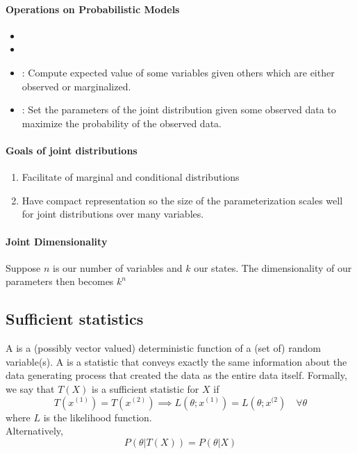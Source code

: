 \documentclass[11pt]{article}
\begin{document}
\paragraph{Operations on Probabilistic Models}
\begin{itemize}
	\item {}
	\item {}
	\item {}: Compute expected value of some variables given others which are either observed or marginalized.
	\item {}: Set the parameters of the joint distribution given some observed data to maximize the probability of the observed data.
\end{itemize}

\paragraph{Goals of joint distributions}
\begin{enumerate}
	\item Facilitate  of marginal and conditional distributions
	\item Have compact representation so the size of the parameterization scales well for joint distributions over many variables.
\end{enumerate}

\paragraph{Joint Dimensionality}
Suppose $n$ is our number of variables and $k$ our states. The dimensionality of our parameters then becomes $k^n$

\subsection{Sufficient statistics}
A  is a (possibly vector valued) deterministic function of a (set of) random variable(s). A  is a statistic that conveys exactly the same information about the data generating process that created the data as the entire data itself. Formally, we say that $T(X)$ is a sufficient statistic for $X$ if
$$T(x^{(1)}) = T(x^{(2)}) \implies L(\theta; x^{(1)}) = L(\theta; x^{(2}) \quad \forall \theta$$
where $L$ is the likelihood function. \\
Alternatively,
$$P(\theta | T(X)) = P(\theta|X)$$
\end{document}
